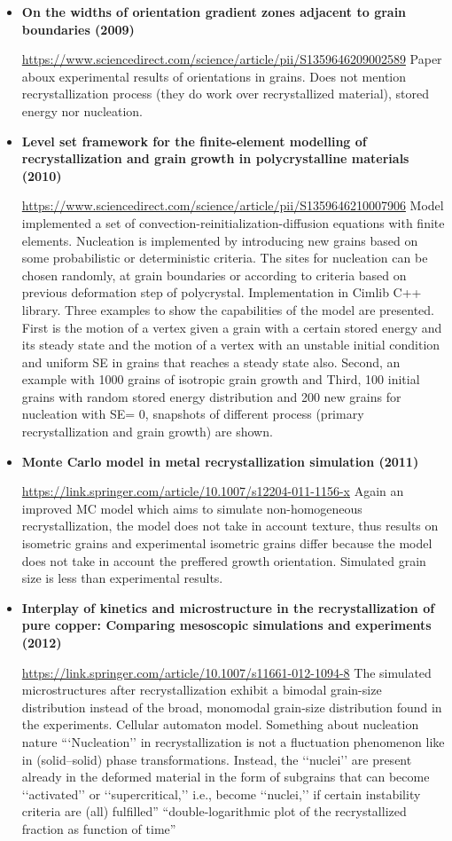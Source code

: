 \begin{itemize}
\item \textbf{On the widths of orientation gradient zones adjacent to grain boundaries (2009)}

\url{https://www.sciencedirect.com/science/article/pii/S1359646209002589}
Paper aboux experimental results of orientations in grains. Does not mention recrystallization process (they do work over recrystallized material), stored energy nor nucleation.

\item \textbf{Level set framework for the finite-element modelling of recrystallization and grain growth in polycrystalline materials (2010)}

\url{https://www.sciencedirect.com/science/article/pii/S1359646210007906}
Model implemented a set of convection-reinitialization-diffusion equations with finite elements. Nucleation is implemented by introducing new grains based on some probabilistic or deterministic criteria. The sites for nucleation can be chosen randomly, at grain boundaries or according to criteria based on previous deformation step of polycrystal. Implementation in Cimlib C++ library. Three examples to show the capabilities of the model are presented. First is the motion of a vertex given a grain with a certain stored energy and its steady state and the motion of a vertex with an unstable initial condition and uniform SE in grains that reaches a steady state also. Second, an example with 1000 grains of isotropic grain growth and Third, 100 initial grains with random stored energy distribution and 200 new grains for nucleation with SE= 0, snapshots of different process (primary recrystallization and grain growth) are shown.

\item \textbf{Monte Carlo model in metal recrystallization simulation (2011)}

\url{https://link.springer.com/article/10.1007/s12204-011-1156-x}
Again an improved MC model which aims to simulate non-homogeneous recrystallization, the model does not take in account texture, thus results on isometric grains and experimental isometric grains differ because the model does not take in account the preffered growth orientation. Simulated grain size is less than experimental results.

\item \textbf{Interplay of kinetics and microstructure in the recrystallization of pure copper: Comparing mesoscopic simulations and experiments (2012)}

\url{https://link.springer.com/article/10.1007/s11661-012-1094-8}
The simulated microstructures after recrystallization exhibit a bimodal grain-size distribution instead of the broad, monomodal grain-size distribution found in the experiments. Cellular automaton model. Something about nucleation nature “‘Nucleation’’ in recrystallization is not a fluctuation phenomenon like in (solid–solid) phase transformations. Instead, the ‘‘nuclei’’ are present already in the deformed material in the form of subgrains that can become ‘‘activated’’ or ‘‘supercritical,’’ i.e., become ‘‘nuclei,’’ if certain instability criteria are (all) fulfilled”
“double-logarithmic plot of the recrystallized fraction as function of time”


\end{itemize}
